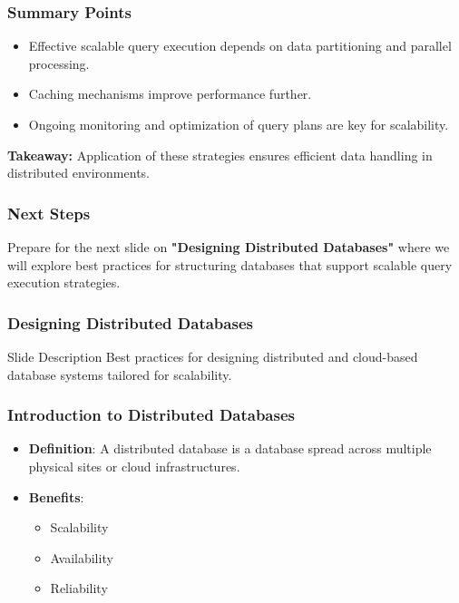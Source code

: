 \documentclass[aspectratio=169]{beamer}
\begin{document}
\begin{frame}[fragile]
    \frametitle{Summary Points}

    \begin{itemize}
        \item Effective scalable query execution depends on data partitioning and parallel processing.
        \item Caching mechanisms improve performance further.
        \item Ongoing monitoring and optimization of query plans are key for scalability.
    \end{itemize}

    \textbf{Takeaway:} Application of these strategies ensures efficient data handling in distributed environments.
    
\end{frame}

\begin{frame}[fragile]
    \frametitle{Next Steps}

    Prepare for the next slide on \textbf{"Designing Distributed Databases"} where we will explore best practices for structuring databases that support scalable query execution strategies.
    
\end{frame}

\begin{frame}[fragile]
    \frametitle{Designing Distributed Databases}
    \begin{block}{Slide Description}
        Best practices for designing distributed and cloud-based database systems tailored for scalability.
    \end{block}
\end{frame}

\begin{frame}[fragile]
    \frametitle{Introduction to Distributed Databases}
    \begin{itemize}
        \item \textbf{Definition}: A distributed database is a database spread across multiple physical sites or cloud infrastructures.
        \item \textbf{Benefits}:
        \begin{itemize}
            \item Scalability
            \item Availability
            \item Reliability
        \end{itemize}
    \end{itemize}
\end{frame}
\end{document}
